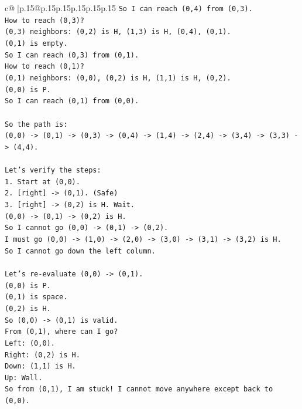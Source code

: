 \documentclass{article}
\begin{document}
{\begin{supertabular}{c@{$\;$}|p{.15\linewidth}@{}p{.15\linewidth}p{.15\linewidth}p{.15\linewidth}p{.15\linewidth}p{.15\linewidth}}
{{{\texttt{So I can reach (0,4) from (0,3).} \\
\texttt{How to reach (0,3)?} \\
\texttt{(0,3) neighbors: (0,2) is H, (1,3) is H, (0,4), (0,1).} \\
\texttt{(0,1) is empty.} \\
\texttt{So I can reach (0,3) from (0,1).} \\
\texttt{How to reach (0,1)?} \\
\texttt{(0,1) neighbors: (0,0), (0,2) is H, (1,1) is H, (0,2).} \\
\texttt{(0,0) is P.} \\
\texttt{So I can reach (0,1) from (0,0).} \\
\\ 
\texttt{So the path is:} \\
\texttt{(0,0) {-}> (0,1) {-}> (0,3) {-}> (0,4) {-}> (1,4) {-}> (2,4) {-}> (3,4) {-}> (3,3) {-}> (4,4).} \\
\\ 
\texttt{Let's verify the steps:} \\
\texttt{1. Start at (0,0).} \\
\texttt{2. {[}right{]} {-}> (0,1). (Safe)} \\
\texttt{3. {[}right{]} {-}> (0,2) is H. Wait.} \\
\texttt{(0,0) {-}> (0,1) {-}> (0,2) is H.} \\
\texttt{So I cannot go (0,0) {-}> (0,1) {-}> (0,2).} \\
\texttt{I must go (0,0) {-}> (1,0) {-}> (2,0) {-}> (3,0) {-}> (3,1) {-}> (3,2) is H.} \\
\texttt{So I cannot go down the left column.} \\
\\ 
\texttt{Let's re{-}evaluate (0,0) {-}> (0,1).} \\
\texttt{(0,0) is P.} \\
\texttt{(0,1) is space.} \\
\texttt{(0,2) is H.} \\
\texttt{So (0,0) {-}> (0,1) is valid.} \\
\texttt{From (0,1), where can I go?} \\
\texttt{Left: (0,0).} \\
\texttt{Right: (0,2) is H.} \\
\texttt{Down: (1,1) is H.} \\
\texttt{Up: Wall.} \\
\texttt{So from (0,1), I am stuck! I cannot move anywhere except back to (0,0).} \\
}}}
\end{supertabular}}
\end{document}

